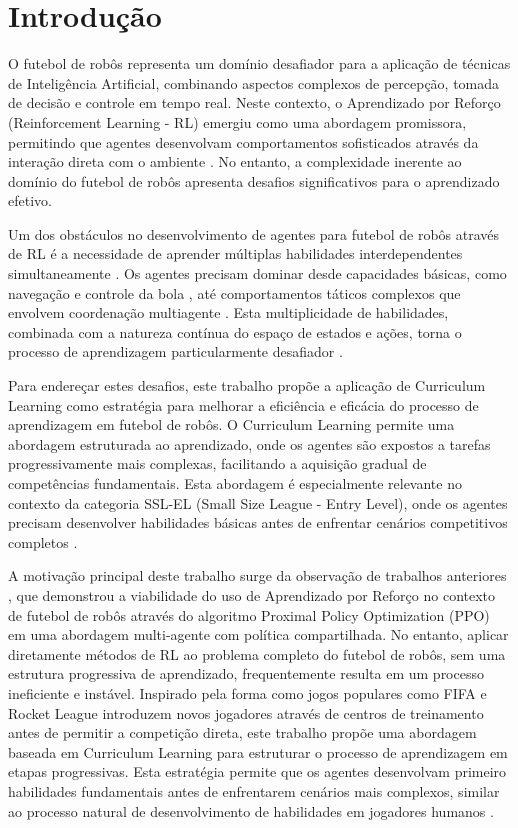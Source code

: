 
\chapter{Introdução}
\label{cap:intro}

O futebol de robôs representa um domínio desafiador para a aplicação de técnicas de Inteligência Artificial, combinando aspectos complexos de percepção, tomada de decisão e controle em tempo real. Neste contexto, o Aprendizado por Reforço (Reinforcement Learning - RL) emergiu como uma abordagem promissora, permitindo que agentes desenvolvam comportamentos sofisticados através da interação direta com o ambiente \cite{sutton}. No entanto, a complexidade inerente ao domínio do futebol de robôs apresenta desafios significativos para o aprendizado efetivo.

Um dos obstáculos no desenvolvimento de agentes para futebol de robôs através de RL é a necessidade de aprender múltiplas habilidades interdependentes simultaneamente \cite{ssl_skills}. Os agentes precisam dominar desde capacidades básicas, como navegação e controle da bola \cite{soccer_skills_bipedal_robot}, até comportamentos táticos complexos que envolvem coordenação multiagente \cite{bruno_brandao}. Esta multiplicidade de habilidades, combinada com a natureza contínua do espaço de estados e ações, torna o processo de aprendizagem particularmente desafiador \cite{soccer_skills_bipedal_robot}.

Para endereçar estes desafios, este trabalho propõe a aplicação de Curriculum Learning \cite{curriculum} como estratégia para melhorar a eficiência e eficácia do processo de aprendizagem em futebol de robôs. O Curriculum Learning permite uma abordagem estruturada ao aprendizado, onde os agentes são expostos a tarefas progressivamente mais complexas, facilitando a aquisição gradual de competências fundamentais. Esta abordagem é especialmente relevante no contexto da categoria SSL-EL (Small Size League - Entry Level), onde os agentes precisam desenvolver habilidades básicas antes de enfrentar cenários competitivos completos \cite{regras_ssl_el_2024}.

A motivação principal deste trabalho surge da observação de trabalhos anteriores \cite{bruno_brandao}, que demonstrou a viabilidade do uso de Aprendizado por Reforço no contexto de futebol de robôs através do algoritmo Proximal Policy Optimization (PPO) em uma abordagem multi-agente com política compartilhada. No entanto, aplicar diretamente métodos de RL ao problema completo do futebol de robôs, sem uma estrutura progressiva de aprendizado, frequentemente resulta em um processo ineficiente e instável. Inspirado pela forma como jogos populares como FIFA e Rocket League introduzem novos jogadores através de centros de treinamento antes de permitir a competição direta, este trabalho propõe uma abordagem baseada em Curriculum Learning para estruturar o processo de aprendizagem em etapas progressivas. Esta estratégia permite que os agentes desenvolvam primeiro habilidades fundamentais antes de enfrentarem cenários mais complexos, similar ao processo natural de desenvolvimento de habilidades em jogadores humanos \cite{relay_long_horizon}.


